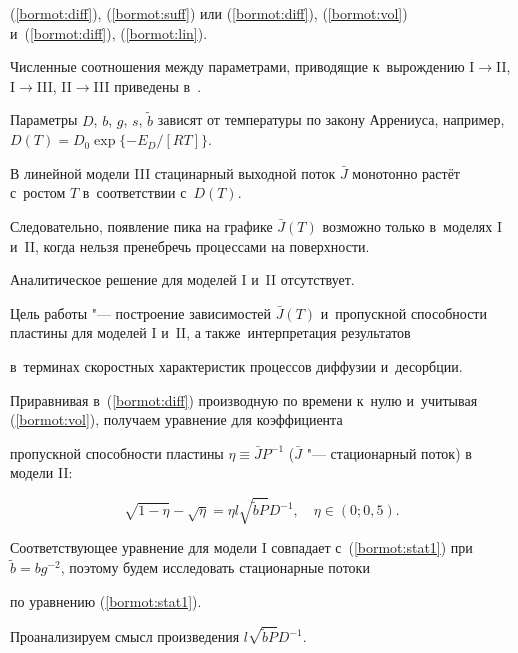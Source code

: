(\ref{bormot:diff}), (\ref{bormot:suff}) или (\ref{bormot:diff}), (\ref{bormot:vol}) и~(\ref{bormot:diff}), (\ref{bormot:lin}).

Численные соотношения между параметрами, приводящие к~вырождению I$\rightarrow$II, I$\rightarrow$III, II$\rightarrow$III приведены в~\cite{bormatova:bib:Zaika2}.



Параметры $D$, $b$, $g$, $s$, $\tilde b$ зависят от температуры по закону Аррениуса, например, $D(T)=D_0\exp\{-E_D/[RT]\}$.



В линейной модели III стацинарный выходной поток $\bar J$ монотонно растёт с~ростом $T$ в~соответствии с~$D(T)$.

Следовательно, появление пика на графике $\bar J(T)$ возможно только в~моделях I и~II, когда нельзя пренебречь процессами на поверхности.

Аналитическое решение для моделей I и~II отсутствует.



Цель работы "--- построение зависимостей $\bar J(T)$ и~пропускной способности пластины для моделей I и~II, а также~интерпретация результатов

в~терминах скоростных характеристик процессов диффузии и~десорбции.



\smallskip



 Приравнивая в~(\ref{bormot:diff}) производную по времени к~нулю и~учитывая (\ref{bormot:vol}), получаем уравнение для коэффициента

пропускной способности пластины $\eta \equiv \bar{J}P^{-1}$ ($\bar{J}$ "--- стационарный поток) в модели II:

\begin{equation} \label{bormot:stat1}

\sqrt{1-\eta}-\sqrt{\eta}=\eta l  \sqrt{\tilde bP}{D}^{-1}, \quad \eta \in (0; 0,5).

 \end{equation}

Соответствующее уравнение для модели I совпадает с~(\ref{bormot:stat1}) при $\tilde b=bg^{-2}$, поэтому будем исследовать стационарные потоки

по уравнению (\ref{bormot:stat1}).

Проанализируем смысл произведения $l \sqrt{\tilde bP}{D}^{-1}$.



